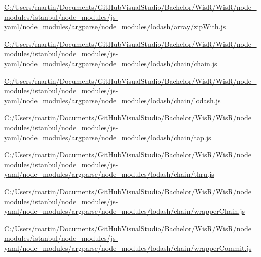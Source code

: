 \begin{DoxyCompactItemize}
\item 
\hyperlink{_c_1_2_users_2martin_2_documents_2_git_hub_visual_studio_2_bachelor_2_wis_r_2_wis_r_2node_modulef8d9d650ae45e2e715d5418fbfbaea55}{C\+:/\+Users/martin/\+Documents/\+Git\+Hub\+Visual\+Studio/\+Bachelor/\+Wis\+R/\+Wis\+R/node\+\_\+modules/istanbul/node\+\_\+modules/js-\/yaml/node\+\_\+modules/argparse/node\+\_\+modules/lodash/array/zip\+With.\+js}
\item 
\hyperlink{_c_1_2_users_2martin_2_documents_2_git_hub_visual_studio_2_bachelor_2_wis_r_2_wis_r_2node_modulea05ee6bf27c85b768adae17af6f4190c}{C\+:/\+Users/martin/\+Documents/\+Git\+Hub\+Visual\+Studio/\+Bachelor/\+Wis\+R/\+Wis\+R/node\+\_\+modules/istanbul/node\+\_\+modules/js-\/yaml/node\+\_\+modules/argparse/node\+\_\+modules/lodash/chain/chain.\+js}
\item 
\hyperlink{_c_1_2_users_2martin_2_documents_2_git_hub_visual_studio_2_bachelor_2_wis_r_2_wis_r_2node_module1bb015b6ab075f06e170ec845926af79}{C\+:/\+Users/martin/\+Documents/\+Git\+Hub\+Visual\+Studio/\+Bachelor/\+Wis\+R/\+Wis\+R/node\+\_\+modules/istanbul/node\+\_\+modules/js-\/yaml/node\+\_\+modules/argparse/node\+\_\+modules/lodash/chain/lodash.\+js}
\item 
\hyperlink{_c_1_2_users_2martin_2_documents_2_git_hub_visual_studio_2_bachelor_2_wis_r_2_wis_r_2node_module0d28211e20e702eaefebeaf4d7e055f0}{C\+:/\+Users/martin/\+Documents/\+Git\+Hub\+Visual\+Studio/\+Bachelor/\+Wis\+R/\+Wis\+R/node\+\_\+modules/istanbul/node\+\_\+modules/js-\/yaml/node\+\_\+modules/argparse/node\+\_\+modules/lodash/chain/tap.\+js}
\item 
\hyperlink{_c_1_2_users_2martin_2_documents_2_git_hub_visual_studio_2_bachelor_2_wis_r_2_wis_r_2node_module27a13c180df351666d836523f503db2c}{C\+:/\+Users/martin/\+Documents/\+Git\+Hub\+Visual\+Studio/\+Bachelor/\+Wis\+R/\+Wis\+R/node\+\_\+modules/istanbul/node\+\_\+modules/js-\/yaml/node\+\_\+modules/argparse/node\+\_\+modules/lodash/chain/thru.\+js}
\item 
\hyperlink{_c_1_2_users_2martin_2_documents_2_git_hub_visual_studio_2_bachelor_2_wis_r_2_wis_r_2node_module764979b6be2b55b0642ab6ab07ed566d}{C\+:/\+Users/martin/\+Documents/\+Git\+Hub\+Visual\+Studio/\+Bachelor/\+Wis\+R/\+Wis\+R/node\+\_\+modules/istanbul/node\+\_\+modules/js-\/yaml/node\+\_\+modules/argparse/node\+\_\+modules/lodash/chain/wrapper\+Chain.\+js}
\item 
\hyperlink{_c_1_2_users_2martin_2_documents_2_git_hub_visual_studio_2_bachelor_2_wis_r_2_wis_r_2node_module611d5b6ff884faa8bcfda73e39691f30}{C\+:/\+Users/martin/\+Documents/\+Git\+Hub\+Visual\+Studio/\+Bachelor/\+Wis\+R/\+Wis\+R/node\+\_\+modules/istanbul/node\+\_\+modules/js-\/yaml/node\+\_\+modules/argparse/node\+\_\+modules/lodash/chain/wrapper\+Commit.\+js}

\end{DoxyCompactItemize}
